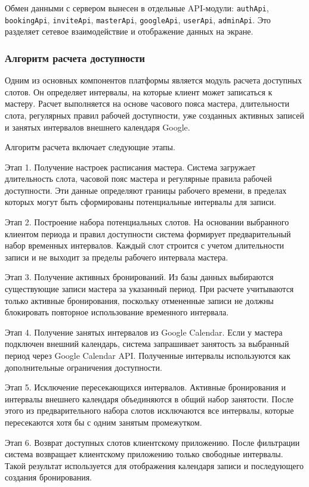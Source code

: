 Обмен данными с сервером вынесен в отдельные API-модули: \texttt{authApi}, \texttt{bookingApi}, \texttt{inviteApi}, \texttt{masterApi}, \texttt{googleApi}, \texttt{userApi}, \texttt{adminApi}. Это разделяет сетевое взаимодействие и отображение данных на экране.

\subsubsection{Алгоритм расчета доступности}

Одним из основных компонентов платформы является модуль расчета доступных слотов. Он определяет интервалы, на которые клиент может записаться к мастеру. Расчет выполняется на основе часового пояса мастера, длительности слота, регулярных правил рабочей доступности, уже созданных активных записей и занятых интервалов внешнего календаря Google.

Алгоритм расчета включает следующие этапы.

Этап 1. Получение настроек расписания мастера.
Система загружает длительность слота, часовой пояс мастера и регулярные правила рабочей доступности. Эти данные определяют границы рабочего времени, в пределах которых могут быть сформированы потенциальные интервалы для записи.

Этап 2. Построение набора потенциальных слотов.
На основании выбранного клиентом периода и правил доступности система формирует предварительный набор временных интервалов. Каждый слот строится с учетом длительности записи и не выходит за пределы рабочего интервала мастера.

Этап 3. Получение активных бронирований.
Из базы данных выбираются существующие записи мастера за указанный период. При расчете учитываются только активные бронирования, поскольку отмененные записи не должны блокировать повторное использование временного интервала.

Этап 4. Получение занятых интервалов из Google Calendar.
Если у мастера подключен внешний календарь, система запрашивает занятость за выбранный период через Google Calendar API. Полученные интервалы используются как дополнительные ограничения доступности.

Этап 5. Исключение пересекающихся интервалов.
Активные бронирования и интервалы внешнего календаря объединяются в общий набор занятости. После этого из предварительного набора слотов исключаются все интервалы, которые пересекаются хотя бы с одним занятым промежутком.

Этап 6. Возврат доступных слотов клиентскому приложению.
После фильтрации система возвращает клиентскому приложению только свободные интервалы. Такой результат используется для отображения календаря записи и последующего создания бронирования.

